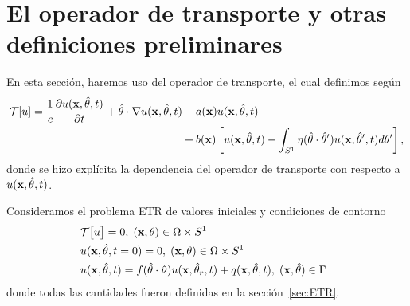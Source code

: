 \section{El operador de transporte y otras definiciones preliminares}
En esta sección, haremos uso del operador de transporte, el cual definimos
según
\begin{equation}
\begin{split}
\mathcal{T}[u]=\frac{1}
{c}\frac{\partial u(\mathbf{x},\hat{\theta},t)}{\partial t} + \hat{\theta} \cdot \nabla u(\mathbf{x},\hat{\theta},t)&+a(\mathbf{x})u(\mathbf{x},\hat{\theta},t)\\
&+b(\mathbf{x})\left[u(\mathbf{x},\hat{\theta},t) - \int_{S^1}\eta(\hat{\theta}\cdot\hat{\theta} ') u(\mathbf{x},\hat{\theta}',t) d\theta'\right],
\end{split}
\label{eq:Toper}
\end{equation}
donde se hizo explícita la dependencia del operador de transporte  
con respecto a $u(\mathbf{x},\hat{\theta},t)$. 

Consideramos el problema ETR de valores iniciales y condiciones 
de contorno
\begin{equation}
\begin{split}
\begin{aligned}
&\mathcal{T}\big[u\big]=0, \;  (\mathbf{x},\theta)  \in \Omega\times S^1\\
&u(\mathbf{x},\hat{\theta},t=0)=0, \;  (\mathbf{x},\theta)  \in \Omega\times S^1 \\
&u(\mathbf{x},\hat{\theta},t)=f(\hat{\theta} \cdot \hat{\nu}) u(\mathbf{x},\hat{\theta}_r,t) + q(\mathbf{x},\hat{\theta},t) , \; (\mathbf{x},\hat{\theta}) \in \Gamma_-
\end{aligned}
\end{split}
\label{eq:RTEt}
\end{equation}
donde todas las cantidades fueron definidas en la sección~\ref{sec:ETR}.


